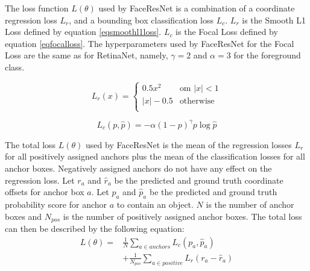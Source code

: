 \documentclass[a4paper, twoside]{article}
\begin{document}
The loss function $L(\theta)$ used by FaceResNet is a combination of a coordinate regression loss $L_r$, and a bounding box classification loss $L_c$. $L_r$ is the Smooth L1 Loss defined by equation \ref{eqsmoothl1loss}. $L_c$ is the Focal Loss defined by equation \ref{eqfocalloss}. The hyperparameters used by FaceResNet for the Focal Loss are the same as for RetinaNet, namely, $\gamma=2$ and $\alpha = 3$ for the foreground class. \cite{retinanet}

\begin{equation}\label{eqfocalloss}
L_r(x) = \begin{cases}
				0.5x^2 & \mbox{om } |x| < 1\\
				|x| - 0.5 & \mbox{otherwise}\\
			\end{cases}
\end{equation}

\begin{equation}\label{eqsmoothl1loss}
L_c(p, \hat{p}) = - \alpha (1-p)^{\gamma}p \log{\hat{p}}
\end{equation}

The total loss $L(\theta)$ used by FaceResNet is the mean of the regression losses $L_r$ for all positively assigned anchors plus the mean of the classification losses for all anchor boxes. Negatively assigned anchors do not have any effect on the regression loss. Let $r_a$ and $\hat{r}_a$ be the predicted and ground truth coordinate offsets for anchor box $a$. Let $p_a$ and $\hat{p}_a$ be the predicted and ground truth probability score for anchor $a$ to contain an object. $N$ is the number of anchor boxes and $N_{pos}$ is the number of positively assigned anchor boxes. The total loss can then be described by the following equation:
\begin{equation}
\begin{split}
	L(\theta) = &  \frac{1}{N} \sum_{a \in anchors} L_c(p_a, \hat{p}_a) \\
	& + \frac{1}{N_{pos}} \sum_{a \in positive} L_r(r_a - \hat{r}_a)  \\ 
\end{split}
\end{equation}
\end{document}
